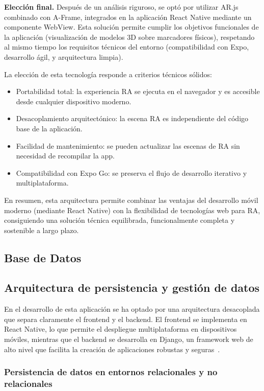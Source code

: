 \textbf{Elección final.}
Después de un análisis riguroso, se optó por utilizar AR.js combinado con A-Frame, integrados en la aplicación React Native mediante un componente WebView. Esta solución permite cumplir los objetivos funcionales de la aplicación (visualización de modelos 3D sobre marcadores físicos), respetando al mismo tiempo los requisitos técnicos del entorno (compatibilidad con Expo, desarrollo ágil, y arquitectura limpia).

La elección de esta tecnología responde a criterios técnicos sólidos:

\begin{itemize}
    \item Portabilidad total: la experiencia RA se ejecuta en el navegador y es accesible desde cualquier dispositivo moderno.
    \item Desacoplamiento arquitectónico: la escena RA es independiente del código base de la aplicación.
    \item Facilidad de mantenimiento: se pueden actualizar las escenas de RA sin necesidad de recompilar la app.
    \item Compatibilidad con Expo Go: se preserva el flujo de desarrollo iterativo y multiplataforma.
\end{itemize}

En resumen, esta arquitectura permite combinar las ventajas del desarrollo móvil moderno (mediante React Native) con la flexibilidad de tecnologías web para RA, consiguiendo una solución técnica equilibrada, funcionalmente completa y sostenible a largo plazo.

\subsection{Base de Datos}

\subsection{Arquitectura de persistencia y gestión de datos}

En el desarrollo de esta aplicación se ha optado por una arquitectura desacoplada que separa claramente el frontend y el backend. El frontend se implementa en React Native, lo que permite el despliegue multiplataforma en dispositivos móviles, mientras que el backend se desarrolla en Django, un framework web de alto nivel que facilita la creación de aplicaciones robustas y seguras~\cite{django2024}.

\subsubsection{Persistencia de datos en entornos relacionales y no relacionales}

